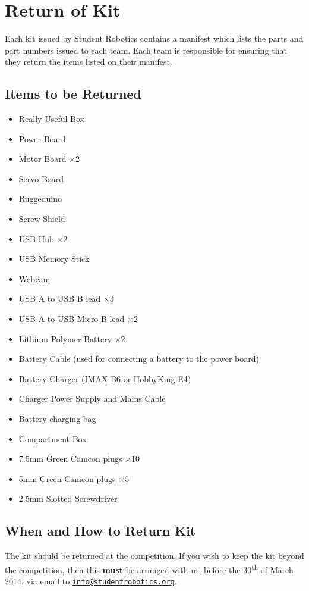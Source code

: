 \section {Return of Kit}
\label{sec:kit-return}

Each kit issued by Student Robotics contains a manifest which lists the parts and part numbers issued to each team.
Each team is responsible for ensuring that they return the items listed on their manifest.

\subsection {Items to be Returned}

\begin{itemize}
 \setlength{\itemsep}{0.3em}
 \item Really Useful Box

 \item Power Board
 \item Motor Board $\times 2$
 \item Servo Board
 \item Ruggeduino
 \item Screw Shield

 \item USB Hub $\times 2$
 \item USB Memory Stick
 \item Webcam
 \item USB A to USB B lead $\times 3$
 \item USB A to USB Micro-B lead $\times 2$

 \item Lithium Polymer Battery $\times 2$
 \item Battery Cable (used for connecting a battery to the power board)
 \item Battery Charger (IMAX B6 or HobbyKing E4)
 \item Charger Power Supply and Mains Cable
 \item Battery charging bag

 \item Compartment Box
 \item 7.5mm Green Camcon plugs $\times 10$
 \item 5mm Green Camcon plugs $\times 5$
 \item 2.5mm Slotted Screwdriver
\end{itemize}

\subsection {When and How to Return Kit}

The kit should be returned at the competition.
If you wish to keep the kit beyond the competition, then this \textbf{must} be arranged with us,
 before the 30\textsuperscript{th} of March 2014, via email to \href{mailto:info@studentrobotics.org}{\nolinkurl{info@studentrobotics.org}}.
